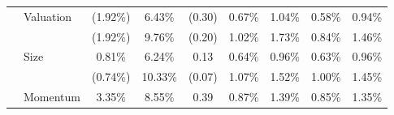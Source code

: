 \documentclass[12pt]{article}
\begin{document}
\begin{table}[H]
{\begin{tabular}{@{}llccccccc@{}}
                              & Valuation                                              & (1.92\%)                                                     & 6.43\%                                                          & (0.30)                                                 & 0.67\%                                                        & 1.04\%                                                       & 0.58\%                                                        & 0.94\%                                                      \\
                              &                                                        & {\color[HTML]{303498} (1.92\%)}                             & {\color[HTML]{303498} 9.76\%}                                   & {\color[HTML]{303498} (0.20)}                          & {\color[HTML]{303498} 1.02\%}                                 & {\color[HTML]{303498} 1.73\%}                                & {\color[HTML]{303498} 0.84\%}                                 & {\color[HTML]{303498} 1.46\%}                               \\
                              & Size                                                   & 0.81\%                                                      & 6.24\%                                                          & 0.13                                                   & 0.64\%                                                        & 0.96\%                                                       & 0.63\%                                                        & 0.96\%                                                      \\
                              &                                                        & {\color[HTML]{303498} (0.74\%)}                             & {\color[HTML]{303498} 10.33\%}                                  & {\color[HTML]{303498} (0.07)}                          & {\color[HTML]{303498} 1.07\%}                                 & {\color[HTML]{303498} 1.52\%}                                & {\color[HTML]{303498} 1.00\%}                                 & {\color[HTML]{303498} 1.45\%}                               \\
                              & Momentum                                               & 3.35\%                                                      & 8.55\%                                                          & 0.39                                                   & 0.87\%                                                        & 1.39\%                                                       & 0.85\%                                                        & 1.35\%                                                      \\

\end{tabular}}
\end{table}
\end{document}
